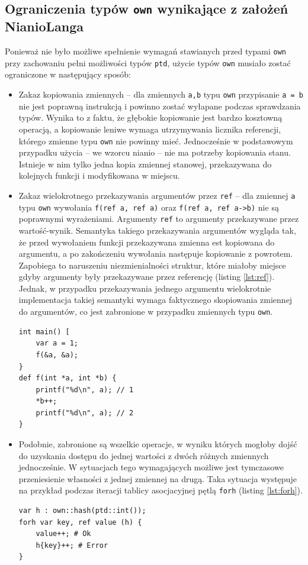 \documentclass[licencjacka]{pracamgr}
\begin{document}
\subsection{Ograniczenia typów \texttt{own} wynikające z założeń NianioLanga}
Ponieważ nie było możliwe spełnienie wymagań stawianych przed typami \texttt{own} przy zachowaniu pełni
możliwości typów \texttt{ptd}, użycie typów \texttt{own} musiało zostać ograniczone w następujący sposób:
\begin{itemize}
 \item Zakaz kopiowania zmiennych -- dla zmiennych \texttt{a,b} typu \texttt{own} przypisanie
 \texttt{a = b} nie jest poprawną instrukcją i powinno zostać wyłapane podczas sprawdzania typów.
 Wynika to z faktu, że głębokie kopiowanie jest bardzo kosztowną operacją, a kopiowanie leniwe wymaga
 utrzymywania licznika referencji, którego zmienne typu \texttt{own} nie powinny mieć.
 Jednocześnie w podstawowym przypadku użycia -- we wzorcu nianio -- nie ma potrzeby kopiowania stanu.
 Istnieje w nim tylko jedna kopia zmiennej stanowej, przekazywana do kolejnych funkcji i modyfikowana w miejscu.
 \item Zakaz wielokrotnego przekazywania argumentów przez \texttt{ref} -- dla zmiennej \texttt{a} typu
 \texttt{own} wywołania \texttt{f(ref a, ref a)} oraz \texttt{f(ref a, ref a->b)} nie są poprawnymi wyrażeniami.
 Argumenty \texttt{ref} to argumenty przekazywane przez wartość-wynik.
 Semantyka takiego przekazywania argumentów wygląda tak, że przed wywołaniem funkcji przekazywana zmienna
 est kopiowana do argumentu, a po zakończeniu wywołania następuje kopiowanie z powrotem.
 Zapobiega to naruszeniu niezmienialności struktur,
 które miałoby miejsce gdyby argumenty były przekazywane przez referencję (listing \ref{lst:ref}).
 Jednak, w przypadku przekazywania jednego argumentu wielokrotnie implementacja takiej semantyki wymaga
 faktycznego skopiowania zmiennej do argumentów, co jest zabronione w przypadku zmiennych typu \texttt{own}.
\begin{lstlisting}[caption={Naruszenie niezmienialności wartości w C},label={lst:ref}]
int main() [
	var a = 1;
	f(&a, &a);
}
def f(int *a, int *b) {
	printf("%d\n", a); // 1
	*b++;
	printf("%d\n", a); // 2
}
\end{lstlisting}
 \item Podobnie, zabronione są wszelkie operacje, w wyniku których mogłoby dojść do uzyskania dostępu
 do jednej wartości z dwóch różnych zmiennych jednocześnie. W sytuacjach tego wymagających możliwe jest tymczasowe
 przeniesienie własności z jednej zmiennej na drugą. Taka sytuacja występuje na przykład podczas iteracji
 tablicy asocjacyjnej pętlą \texttt{forh} (listing \ref{lst:forh}).
\begin{lstlisting}[caption={Odwołanie do zmiennej, która utraciła własność},label={lst:forh}]
var h : own::hash(ptd::int());
forh var key, ref value (h) {
	value++; # Ok
	h{key}++; # Error
}
\end{lstlisting}
\end{itemize}
\end{document}

